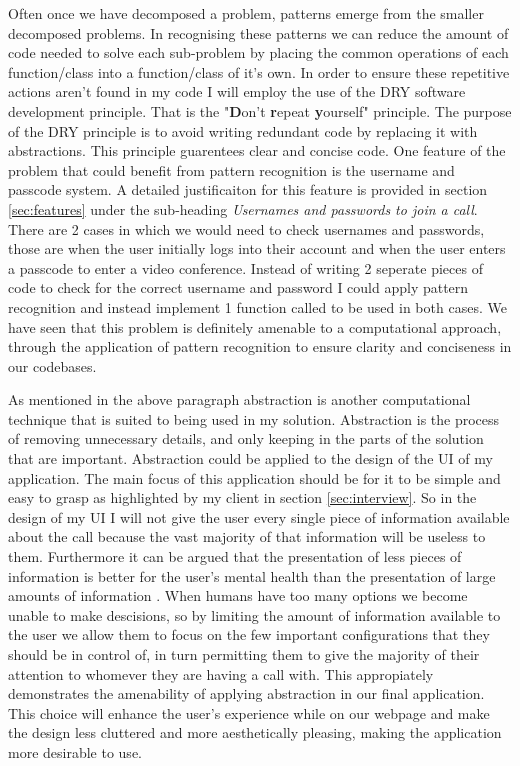 Often once we have decomposed a problem, patterns emerge from 
the smaller decomposed problems. In recognising these patterns
we can reduce the amount of code needed to solve each 
sub-problem by placing the common operations of each 
function/class into a function/class of it's own. In order to 
ensure these repetitive actions aren't found in my code I will
employ the use of the DRY software development principle. 
That is the "\textbf{D}on't \textbf{r}epeat \textbf{y}ourself"
principle. The purpose of the DRY principle is to avoid 
writing redundant code by replacing it with abstractions. This
principle guarentees clear and concise code. One feature of 
the problem that could benefit from pattern recognition is the 
username and passcode system. A detailed justificaiton for this
feature is provided in section \ref{sec:features} under the
sub-heading \textit{Usernames and passwords to join a call}.
There are 2 cases in which we would need to check usernames
and passwords, those are when the user initially logs into 
their account and when the user enters a passcode to enter a
video conference. Instead of writing 2 seperate pieces of
code to check for the correct username and password I could
apply pattern recognition and instead implement 1 function 
called  to be used in both 
cases. We have seen that this problem is definitely amenable 
to a computational approach, through the application of
pattern recognition to ensure clarity and conciseness in our 
codebases. \vspace{0.2cm}

As mentioned in the above paragraph abstraction is another 
computational technique that is suited to being used in my 
solution. Abstraction is the process of removing unnecessary
details, and only keeping in the parts of the solution that are
important. Abstraction could be applied to the design of the 
UI of my application. The main focus of this application should
be for it to be simple and easy to grasp as highlighted by my 
client in section \ref{sec:interview}. So in the design of my
UI I will not give the user every single piece of information
available about the call because the vast majority of that 
information will be useless to them. Furthermore it can be 
argued that the presentation of less pieces of information is
better for the user's mental health than the presentation of
large amounts of information \cite{overchoice}. When humans 
have too many options we become unable to make descisions, so
by limiting the amount of information available to the user we
allow them to focus on the few important configurations that
they should be 
in control of, in turn permitting them to give the majority of
their attention to whomever they are having a call with. This 
appropiately demonstrates the amenability of applying
abstraction in our final application. This choice will enhance
the user's experience while on our webpage and make the design
less cluttered and more aesthetically pleasing, making the 
application more desirable to use.  \\ \vspace{0.2cm}

